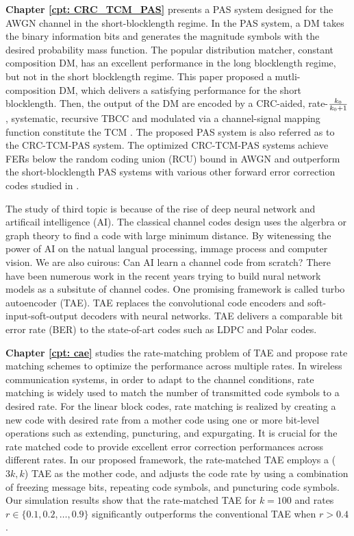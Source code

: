 \documentclass [PhD] {uclathes}
\begin{document}
\textbf{Chapter \ref{cpt: CRC_TCM_PAS}} presents a PAS system designed for the AWGN channel in the short-blocklength regime.
In the PAS system, a DM takes the binary information bits and generates the magnitude symbols with the desired probability mass function. The popular distribution matcher, constant composition DM, has an excellent performance in the long blocklength regime, but not in the short blocklength regime.   This paper proposed a mutli-composition DM, which delivers a satisfying performance for the short blocklength.
Then, the output of the DM are encoded by a CRC-aided, rate-$\frac{k_0}{k_0+1}$, systematic, recursive TBCC and modulated via a channel-signal mapping function constitute the TCM \cite{ungerboeck1982channel}. The proposed PAS system is also referred as to the CRC-TCM-PAS system. 
The optimized CRC-TCM-PAS systems achieve FERs below the random coding union (RCU) bound in AWGN and outperform the short-blocklength PAS systems with various other forward error correction codes studied in \cite{cocskun2019efficient}.


The study of third topic is because of the rise of deep neural network and artificail intelligence (AI). The classical channel codes design uses the algerbra or graph theory to find a code with large minimum distance. By witenessing the power of AI on the natual langual processing, immage process and computer vision. We are also cuirous: Can AI learn a channel code from scratch? There have been numerous work in the recent years trying to build nural network models as a subsitute of channel codes. One promising framework is called turbo autoencoder (TAE).  TAE replaces the convolutional code encoders and soft-input-soft-output decoders with neural networks. TAE delivers a comparable bit error rate (BER) to the state-of-art codes such as LDPC and Polar codes. 

\textbf{Chapter \ref{cpt: cae}} studies the rate-matching problem of TAE and propose rate matching schemes to optimize the performance across multiple rates. In wireless communication systems, in order to adapt to the channel conditions, rate matching is widely used to match the number of transmitted code symbols to a desired rate. For the linear block codes, rate matching is realized by creating a new code with desired rate from a mother code using one or more bit-level operations such as extending, puncturing, and expurgating\cite{blahut2003algebraic}. It is crucial for the rate matched code to provide excellent error correction performances across different rates. In our proposed framework, the rate-matched TAE employs a ($3k,k$) TAE as the mother code, and adjusts the code rate by using a combination of freezing message bits, repeating code symbols, and puncturing code symbols. Our simulation results show that the rate-matched TAE for $k=100$ and rates $r\in \{0.1,0.2,\ldots,0.9\}$ 
significantly outperforms the conventional TAE when $r>0.4$.
\end{document}
